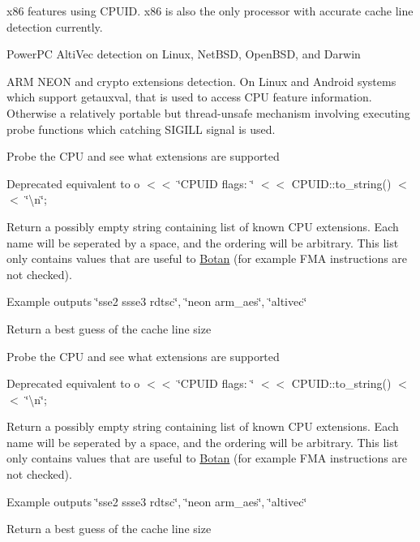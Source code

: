 \begin{DoxyItemize}
\item x86 features using C\+P\+U\+ID. x86 is also the only processor with accurate cache line detection currently.
\item Power\+PC Alti\+Vec detection on Linux, Net\+B\+SD, Open\+B\+SD, and Darwin
\item A\+RM N\+E\+ON and crypto extensions detection. On Linux and Android systems which support getauxval, that is used to access C\+PU feature information. Otherwise a relatively portable but thread-\/unsafe mechanism involving executing probe functions which catching S\+I\+G\+I\+LL signal is used. 
\end{DoxyItemize}Probe the C\+PU and see what extensions are supported

Deprecated equivalent to o $<$$<$ \char`\"{}\+C\+P\+U\+I\+D flags\+: \char`\"{} $<$$<$ C\+P\+U\+I\+D\+::to\+\_\+string() $<$$<$ \char`\"{}\textbackslash{}n\char`\"{};

Return a possibly empty string containing list of known C\+PU extensions. Each name will be seperated by a space, and the ordering will be arbitrary. This list only contains values that are useful to \hyperlink{namespace_botan}{Botan} (for example F\+MA instructions are not checked).

Example outputs \char`\"{}sse2 ssse3 rdtsc\char`\"{}, \char`\"{}neon arm\+\_\+aes\char`\"{}, \char`\"{}altivec\char`\"{}

Return a best guess of the cache line size

Probe the C\+PU and see what extensions are supported

Deprecated equivalent to o $<$$<$ \char`\"{}\+C\+P\+U\+I\+D flags\+: \char`\"{} $<$$<$ C\+P\+U\+I\+D\+::to\+\_\+string() $<$$<$ \char`\"{}\textbackslash{}n\char`\"{};

Return a possibly empty string containing list of known C\+PU extensions. Each name will be seperated by a space, and the ordering will be arbitrary. This list only contains values that are useful to \hyperlink{namespace_botan}{Botan} (for example F\+MA instructions are not checked).

Example outputs \char`\"{}sse2 ssse3 rdtsc\char`\"{}, \char`\"{}neon arm\+\_\+aes\char`\"{}, \char`\"{}altivec\char`\"{}

Return a best guess of the cache line size\mbox{\label{namespace_botan_ac0aa93839be18def47da04e0a2068d2e}} 
